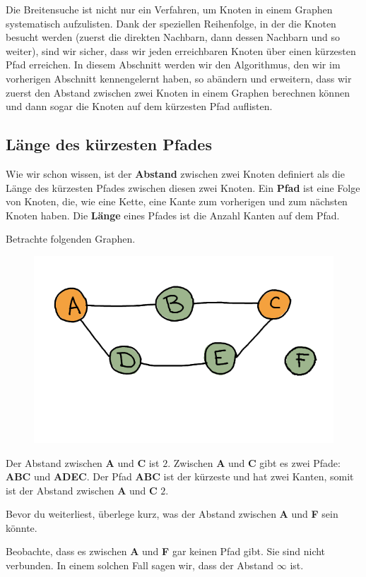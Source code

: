 Die Breitensuche ist nicht nur ein Verfahren, um Knoten in einem Graphen systematisch aufzulisten. Dank der speziellen Reihenfolge, in der die Knoten besucht werden (zuerst die direkten Nachbarn, dann dessen Nachbarn und so weiter), sind wir sicher, dass wir jeden erreichbaren Knoten über einen kürzesten Pfad erreichen. In diesem Abschnitt werden wir den Algorithmus, den wir im vorherigen Abschnitt kennengelernt haben, so abändern und erweitern, dass wir zuerst den Abstand zwischen zwei Knoten in einem Graphen berechnen können und dann sogar die Knoten auf dem kürzesten Pfad auflisten.

\subsection{Länge des kürzesten Pfades}

Wie wir schon wissen, ist der \textbf{Abstand} zwischen zwei Knoten definiert als die Länge des kürzesten Pfades zwischen diesen zwei Knoten. Ein \textbf{Pfad} ist eine Folge von Knoten, die, wie eine Kette, eine Kante zum vorherigen und zum nächsten Knoten haben. Die \textbf{Länge} eines Pfades ist die Anzahl Kanten auf dem Pfad.

\begin{beispiel}
Betrachte folgenden Graphen.
\begin{figure}[H]
\centering
\includegraphics[width=0.5\linewidth]{Pictures/SP/abstand_def.png} 
\end{figure}
Der Abstand zwischen \textbf{A} und \textbf{C} ist \(2\). Zwischen \textbf{A} und \textbf{C} gibt es zwei Pfade: \textbf{ABC} und \textbf{ADEC}. Der Pfad \textbf{ABC} ist der kürzeste und hat zwei Kanten, somit ist der Abstand zwischen \textbf{A} und \textbf{C} \(2\).

Bevor du weiterliest, überlege kurz, was der Abstand zwischen \textbf{A} und \textbf{F} sein könnte.

Beobachte, dass es zwischen \textbf{A} und \textbf{F} gar keinen Pfad gibt. Sie sind nicht verbunden. In einem solchen Fall sagen wir, dass der Abstand \(\infty\) ist.
\end{beispiel}

